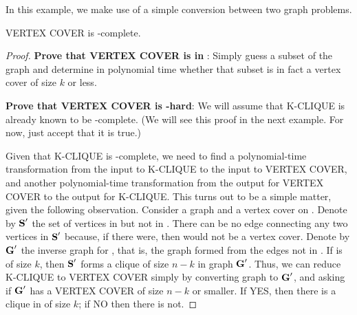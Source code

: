 \begin{example}

In this example, we make use of a simple conversion between two graph
problems.

\begin{theorem}
VERTEX COVER is \NP-complete.
\end{theorem}

\begin{proof}
\textbf{Prove that VERTEX COVER is in \NP}:
Simply guess a subset of the graph and determine in polynomial time
whether that subset is in fact a vertex cover of size \(k\) or less.

\textbf{Prove that VERTEX COVER is
\NP-hard}:
We will assume that K-CLIQUE
is already known to be \NP-complete.
(We will see this proof in the next example.
For now, just accept that it is true.)

Given that K-CLIQUE is \NP-complete, we need to find a
polynomial-time
transformation from the input to K-CLIQUE to the input to VERTEX COVER,
and another polynomial-time transformation from the output for
VERTEX COVER to the output for K-CLIQUE.
This turns out to be a simple matter, given the following observation.
Consider a graph  and a vertex cover  on .
Denote by \({\textbf{S}}'\) the set of vertices in  but not in
.
There can be no edge connecting any two vertices in \({\textbf{S}}'\)
because, if there were, then  would not be a vertex cover.
Denote by \({\textbf{G}}'\) the inverse graph for , that is, the
graph formed from the edges not in .
If  is of size \(k\), then \({\textbf{S}}'\) forms a clique of size
\(n - k\) in graph \({\textbf{G}}'\).
Thus, we can reduce K-CLIQUE to VERTEX COVER simply by converting graph
 to \({\textbf{G}}'\), and asking if \({\textbf{G}}'\) has a VERTEX
COVER of size \(n-k\) or smaller.
If YES, then there is a clique in  of size \(k\); if NO then
there is not.
\end{proof}
\end{example}

